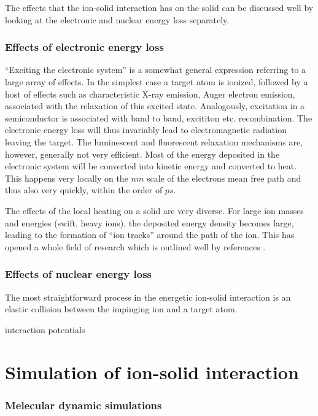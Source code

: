 The effects that the ion-solid interaction has on the solid can be discussed well by looking at the electronic and nuclear energy loss separately. 


\subsubsection{Effects of electronic energy loss}

``Exciting the electronic system'' is a somewhat general expression referring to a large array of effects. In the simplest case a target atom is ionized, followed by a host of effects such as characteristic X-ray emission, Auger electron emission,  associated with the relaxation of this excited state. Analogously, excitation in a semiconductor is associated with band to band, excititon etc. recombination. The electronic energy loss will thus invariably lead to electromagnetic radiation leaving the target. The luminescent and fluorescent relaxation mechanisms are, however, generally not very efficient. Most of the energy deposited in the electronic system will be converted into kinetic energy and converted to heat. This happens very locally on the $nm$ scale of the electrons mean free path and thus also very quickly, within the order of $ps$.

The effects of the local heating on a solid are very diverse. For large ion masses and energies (swift, heavy ions), the deposited energy density becomes large, leading to the formation of ``ion tracks'' around the path of the ion. This has opened a whole field of research which is outlined well by references \cite{toulemonde_transient_1992,miotello_revisiting_1997,wesch_effect_2004}.

\subsubsection{Effects of nuclear energy loss}

The most straightforward process in the energetic ion-solid interaction is an elastic collision between the impinging ion and a target atom.  


interaction potentials \cite{dedkov_interatomic_1995}

\section{Simulation of ion-solid interaction}

\subsubsection{Melecular dynamic simulations}

